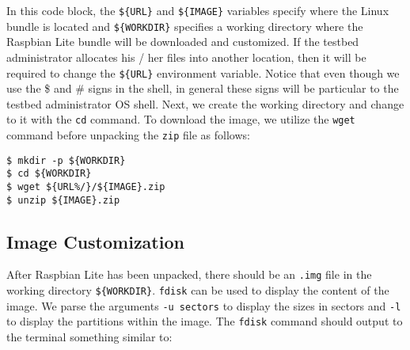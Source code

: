 In this code block, the \texttt{\$\{URL\}} and \texttt{\$\{IMAGE\}}
variables specify where the Linux bundle is located and
\texttt{\$\{WORKDIR\}} specifies a working directory where the Raspbian
Lite bundle will be downloaded and customized. If the testbed administrator
allocates his / her files into another location, then it will be required to
change the \texttt{\$\{URL\}} environment variable. Notice that even though we
use the \$ and \# signs in the shell, in general these signs will be
particular to the testbed administrator \ac{OS} shell. Next, we create
the working directory and change to it with the \texttt{cd} command. To
download the image, we utilize the \texttt{wget} command before unpacking
the \texttt{zip} file as follows:



\begin{lstlisting}[]
$ mkdir -p ${WORKDIR}
$ cd ${WORKDIR}
$ wget ${URL%/}/${IMAGE}.zip
$ unzip ${IMAGE}.zip
\end{lstlisting}
\FloatBarrier
\vspace{-5mm}


\subsection{Image Customization}

After Raspbian Lite has been unpacked, there should be an \texttt{.img}
file in the working directory \texttt{\$\{WORKDIR\}}. \texttt{fdisk} can
be used to display the content of the image. We parse the arguments \texttt{-u sectors}
to display the sizes in sectors and \texttt{-l} to display the partitions
within the image. The \texttt{fdisk} command should output to the terminal
something similar to:


